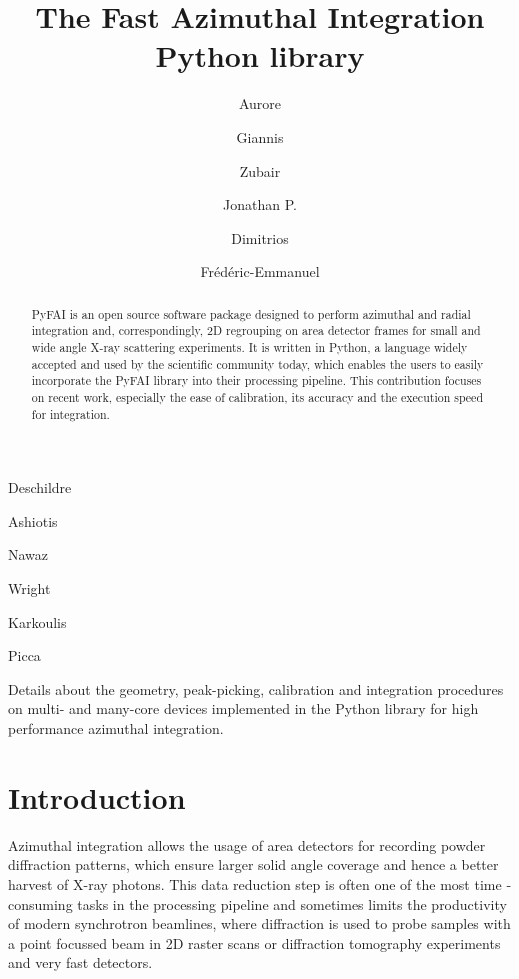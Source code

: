 \documentclass[preprint]{iucr}
\begin{document}
\title{The Fast Azimuthal Integration Python library}

    \author[a]{Aurore}{Deschildre}
    \author[a]{Giannis}{Ashiotis}
    \author[b]{Zubair}{Nawaz}
    \author[a]{Jonathan P.}{Wright}
    \author[a]{Dimitrios}{Karkoulis}
    \author[c]{Fr\'ed\'eric-Emmanuel}{Picca}


\maketitle

\begin{synopsis}
Details about the geometry, peak-picking, calibration and integration procedures
on multi- and many-core devices implemented in the Python library for high
performance azimuthal integration.
\end{synopsis}

\begin{abstract}
PyFAI is an open source software package designed to perform azimuthal and
radial integration and, correspondingly, 2D regrouping on area detector frames for small and wide
angle X-ray scattering experiments.
It is written in Python, a language widely accepted and used by the scientific
community today, which enables the users to easily incorporate the PyFAI
library into their processing pipeline.
This contribution focuses on recent work, especially the ease of
calibration, its accuracy and the execution speed for integration.
\end{abstract}

\section{Introduction}

Azimuthal integration allows the usage of area detectors for recording powder
diffraction patterns, which  ensure larger solid angle coverage and hence a
better harvest of X­-ray photons.
This data reduction step is often one of the most time ­consuming tasks in the
processing pipeline and sometimes limits the productivity of modern synchrotron
beamlines, where diffraction is used to probe samples with a point focussed
beam in 2D raster scans or diffraction tomography experiments and
very fast detectors.
\end{document}

